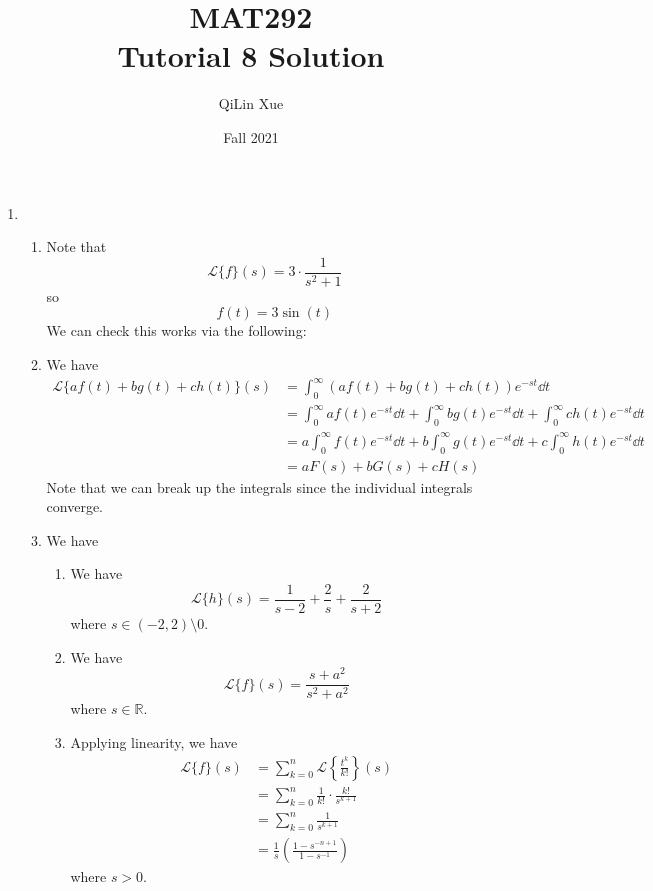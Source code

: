 \documentclass{article}
\title{MAT292 \\ Tutorial 8 Solution}
\author{QiLin Xue}
\date{Fall 2021}
\begin{document}
\newcommand{\tabitem}{~~\llap{\textbullet}~~}

\maketitle
\begin{enumerate}
    \item \begin{enumerate}
        \item Note that
        \begin{equation}
            \mathcal{L}\{f\}(s) = 3 \cdot \frac{1}{s^2+1} 
        \end{equation}
        so 
        \begin{equation}
            f(t) = 3 \sin(t)
        \end{equation}
        We can check this works via the following:
        \item We have 
        \begin{align}
            \mathcal{L}\{af(t)+bg(t)+ch(t)\}(s) &= \int_0^\infty (af(t)+bg(t)+ch(t))e^{-st} \dd{t} \\ 
            &= \int_0^\infty af(t)e^{-st} \dd{t} + \int_0^\infty bg(t)e^{-st} \dd{t} + \int_0^\infty ch(t)e^{-st} \dd{t} \\
            &= a\int_0^\infty f(t)e^{-st}\dd{t} + b\int_0^\infty g(t)e^{-st}\dd{t} + c\int_0^\infty h(t)e^{-st}\dd{t} \\ 
            &= aF(s) + bG(s) + cH(s)
        \end{align}
        Note that we can break up the integrals since the individual integrals converge.
        \item We have 
        \begin{enumerate}
            \item We have
            \begin{equation}
                \mathcal{L}\{h\}(s) = \frac{1}{s-2}+\frac{2}{s}+\frac{2}{s+2}
            \end{equation}
            where $s \in (-2,2) \setminus 0$.
            \item We have 
            \begin{equation}
                \mathcal{L}\{f\}(s) = \frac{s+a^2}{s^2+a^2}
            \end{equation} 
            where $s\in \mathbb{R}$.
            \item Applying linearity, we have
            \begin{align}
                \mathcal{L}\{f\}(s) &= \sum_{k=0}^n \mathcal{L}\left\{\frac{t^k}
                {k!}\right\}(s) \\ 
                &= \sum_{k=0}^n \frac{1}{k!} \cdot \frac{k!}{s^{k+1}} \\ 
                &= \sum_{k=0}^n \frac{1}{s^{k+1}} \\ 
                &= \frac{1}{s}\left(\frac{1-s^{-{n+1}}}{1-s^{-1}}\right)
            \end{align}
            where $s>0$.


\end{enumerate}
\end{enumerate}
\end{enumerate}
\end{document}
